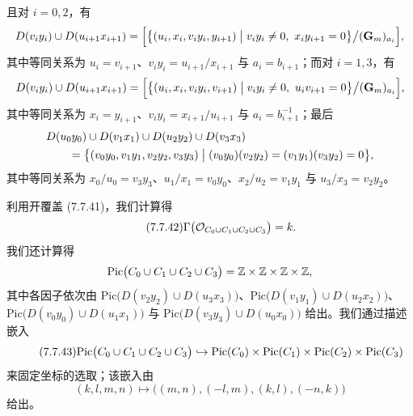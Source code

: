 且对 $i=0,2$，有
\[
D(v_iy_i)\cup D(u_{i+1}x_{i+1})=\Bigl[\bigl\{(u_i,x_i,v_iy_i,y_{i+1})\bigm| v_iy_i\neq0,\ x_iy_{i+1}=0\bigr\}\big/(\mathbf G_m)_{a_i}\Bigr],
\]
其中等同关系为 $u_i=v_{i+1}$、$v_iy_i=u_{i+1}/x_{i+1}$ 与 $a_i=b_{i+1}$；而对 $i=1,3$，有
\[
D(v_iy_i)\cup D(u_{i+1}x_{i+1})=\Bigl[\bigl\{(u_i,x_i,v_iy_i,v_{i+1})\bigm| v_iy_i\neq0,\ u_iv_{i+1}=0\bigr\}\big/(\mathbf G_m)_{a_i}\Bigr],
\]
其中等同关系为 $x_i=y_{i+1}$、$v_iy_i=x_{i+1}/u_{i+1}$ 与 $a_i=b_{i+1}^{-1}$；最后
\[
\begin{aligned}
&D(u_0y_0)\cup D(v_1x_1)\cup D(u_2y_2)\cup D(v_3x_3)\\
&\qquad=\bigl\{(v_0y_0,v_1y_1,v_2y_2,v_3y_3)\bigm|(v_0y_0)(v_2y_2)=(v_1y_1)(v_3y_2)=0\bigr\},
\end{aligned}
\]
其中等同关系为 $x_0/u_0=v_3y_3$、$u_1/x_1=v_0y_0$、$x_2/u_2=v_1y_1$ 与 $u_3/x_3=v_2y_2$。

利用开覆盖 (7.7.41)，我们计算得
\begin{equation}\tag{7.7.42}
\Gamma\bigl(\mathcal{O}_{C_0\cup C_1\cup C_2\cup C_3}\bigr)=k.
\end{equation}
我们还计算得
\[
\mathrm{Pic}\bigl(C_0\cup C_1\cup C_2\cup C_3\bigr)=\mathbb{Z}\times\mathbb{Z}\times\mathbb{Z}\times\mathbb{Z},
\]
其中各因子依次由 $\mathrm{Pic}\bigl(D(v_2y_2)\cup D(u_3x_3)\bigr)$、$\mathrm{Pic}\bigl(D(v_1y_1)\cup D(u_2x_2)\bigr)$、$\mathrm{Pic}\bigl(D(v_0y_0)\cup D(u_1x_1)\bigr)$ 与 $\mathrm{Pic}\bigl(D(v_3y_3)\cup D(u_0x_0)\bigr)$ 给出。我们通过描述嵌入
\begin{equation}\tag{7.7.43}
\mathrm{Pic}\bigl(C_0\cup C_1\cup C_2\cup C_3\bigr)\hookrightarrow\mathrm{Pic}(C_0)\times\mathrm{Pic}(C_1)\times\mathrm{Pic}(C_2)\times\mathrm{Pic}(C_3)
\end{equation}
来固定坐标的选取；该嵌入由
\begin{equation}\tag{7.7.44}
(k,l,m,n)\mapsto\bigl((m,n),(-l,m),(k,l),(-n,k)\bigr)
\end{equation}
给出。

